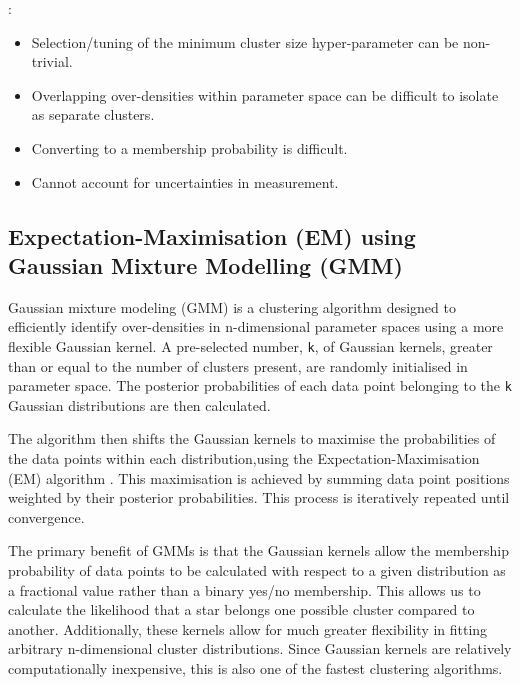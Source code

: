 : 
\begin{itemize}
    \item Selection/tuning of the minimum cluster size hyper-parameter can be non-trivial.
    \item Overlapping over-densities within parameter space can be difficult to isolate as separate clusters.
    \item Converting to a membership probability is difficult.
    \item Cannot account for uncertainties in measurement.
\end{itemize}

\subsection{Expectation-Maximisation (EM) using Gaussian Mixture Modelling (GMM)}

Gaussian mixture modeling (GMM) \cite[e.g.][]{mclachlan_finite_2004} is a clustering algorithm designed to efficiently identify over-densities in n-dimensional parameter spaces using a more flexible Gaussian kernel. A pre-selected number, \texttt{k}, of Gaussian kernels, greater than or equal to the number of clusters present, are randomly initialised in parameter space. The posterior probabilities of each data point belonging to the \texttt{k} Gaussian distributions are then calculated. 

The algorithm then shifts the Gaussian kernels to maximise the probabilities of the data points within each distribution,using the Expectation-Maximisation (EM) algorithm \citep{blei_variational_2005}. This maximisation is achieved by summing data point positions weighted by their posterior probabilities. This process is iteratively repeated until convergence. 

The primary benefit of GMMs is that the Gaussian kernels allow the membership probability of data points to be calculated with respect to a given distribution as a fractional value rather than a binary yes/no membership. This allows us to calculate the likelihood that a star belongs one possible cluster compared to another. Additionally, these kernels allow for much greater flexibility in fitting arbitrary n-dimensional cluster distributions. Since Gaussian kernels are relatively computationally inexpensive, this is also one of the fastest clustering algorithms.

\vspace{10pt}


